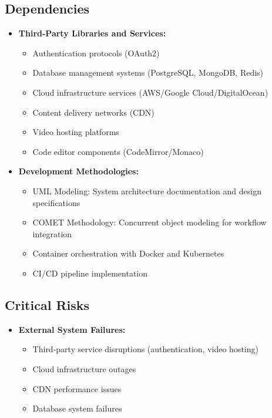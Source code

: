 \documentclass[a4paper, 11pt]{scrreprt}
\begin{document}
\subsection{Dependencies}
\begin{itemize}
    \item \textbf{Third-Party Libraries and Services:}
        \begin{itemize}
            \item Authentication protocols (OAuth2)
            \item Database management systems (PostgreSQL, MongoDB, Redis)
            \item Cloud infrastructure services (AWS/Google Cloud/DigitalOcean)
            \item Content delivery networks (CDN)
            \item Video hosting platforms
            \item Code editor components (CodeMirror/Monaco)
        \end{itemize}
    
    \item \textbf{Development Methodologies:}
        \begin{itemize}
            \item UML Modeling: System architecture documentation and design specifications
            \item COMET Methodology: Concurrent object modeling for workflow integration
            \item Container orchestration with Docker and Kubernetes
            \item CI/CD pipeline implementation
        \end{itemize}
\end{itemize}

\subsection{Critical Risks}
\begin{itemize}
    \item \textbf{External System Failures:}
        \begin{itemize}
            \item Third-party service disruptions (authentication, video hosting)
            \item Cloud infrastructure outages
            \item CDN performance issues
            \item Database system failures
        \end{itemize}
\end{itemize}
\end{document}
